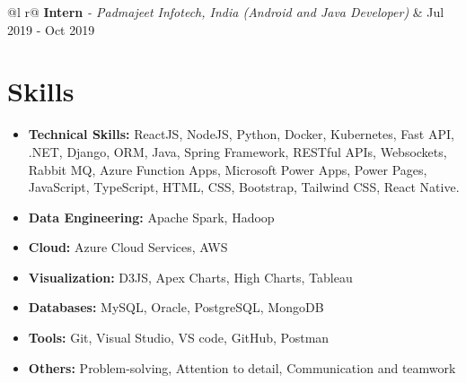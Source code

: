 \documentclass[a4paper,12pt]{article}
\begin{document}
\begin{tabularx}{\linewidth}{@{}l r@{}}
\textbf{Intern} \textit{- Padmajeet Infotech, India (Android and Java Developer)} & \hfill Jul 2019 - Oct 2019 \\
\end{tabularx}

\section{Skills}
\begin{itemize}[noitemsep,topsep=0pt,leftmargin=*]
    \item \textbf{Technical Skills:} ReactJS, NodeJS, Python, Docker, Kubernetes, Fast API, .NET, Django, ORM, Java, Spring Framework, RESTful APIs, Websockets, Rabbit MQ, Azure Function Apps, Microsoft Power Apps, Power Pages, JavaScript, TypeScript, HTML, CSS, Bootstrap, Tailwind CSS, React Native.
    \item \textbf{Data Engineering:} Apache Spark, Hadoop
    \item \textbf{Cloud:} Azure Cloud Services, AWS
    \item \textbf{Visualization:} D3JS, Apex Charts, High Charts, Tableau
    \item \textbf{Databases:} MySQL, Oracle, PostgreSQL, MongoDB
    \item \textbf{Tools:} Git, Visual Studio, VS code, GitHub, Postman
    \item \textbf{Others:} Problem-solving, Attention to detail, Communication and teamwork
\end{itemize}
\end{document}
